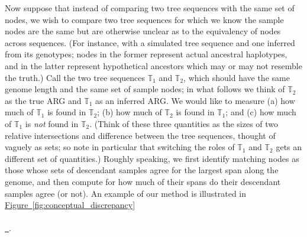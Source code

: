 \documentclass[10pt,twoside,lineno]{gsajnl}
\newcommand{\T}{\mathbb{T}}
\newcommand*{\figref}[2][]{%
	\hyperref[{#2}]{%
		Figure~\ref*{#2}%
		\ifx\\#1\\%
		\else
		\,#1%
		\fi
	}%
}
\begin{document}
Now suppose that instead of comparing two tree sequences with the same set of nodes,
we wish to compare two tree sequences for which we know the sample nodes are the same
but are otherwise unclear as to the equivalency of nodes across sequences.
(For instance, with a simulated tree sequence and one inferred from its genotypes;
nodes in the former represent actual ancestral haplotypes, and in the latter
represent hypothetical ancestors which may or may not resemble the truth.)
Call the two tree sequences $\T_1$ and $\T_2$, which should have the same genome length
and the same set of sample nodes;
in what follows we think of $\T_2$ as the true ARG and $\T_1$ as an inferred ARG. 
We would like to measure (a) how much of $\T_1$ is found in $\T_2$;
(b) how much of $\T_2$ is found in $\T_1$; and
(c) how much of $\T_1$ is \emph{not} found in $\T_2$.
(Think of these three quantities as the sizes of two relative intersections
and difference between the tree sequences,
thought of vaguely as sets;
so note in particular that switching the roles of $\T_1$ and $\T_2$ gets 
an different set of quantities.) 
Roughly speaking, we first identify matching nodes
as those whose sets of descendant samples agree for the largest span along the genome,
and then compute for how much of their spans do their descendant samples agree (or not).
An example of our method is illustrated in \figref{fig:conceptual_discrepancy}.
\end{document}
